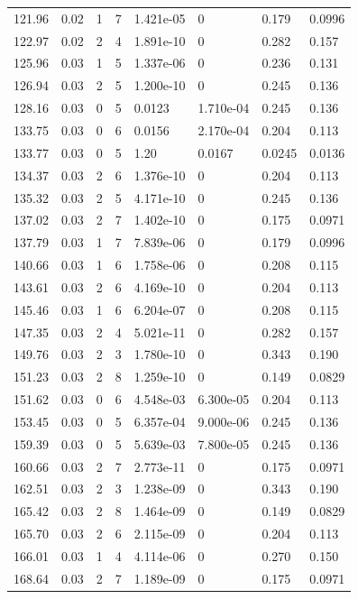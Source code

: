 \documentclass[preview]{standalone}
\begin{document}
{{{\begin{tabular}{L{1.2cm}C{1.2cm} C{0.3cm}C{0.5cm} C{1.4cm}C{1.4cm} C{1.4cm}C{1.4cm}}
  121.96  &  0.02  & 1     &  7 &  1.421e-05  & 0  & 0.179 &  0.0996   \\ 
  122.97  &  0.02  & 2     &  4 &  1.891e-10  & 0  & 0.282 &  0.157   \\ 
  125.96  &  0.03  & 1     &  5 &  1.337e-06  & 0  & 0.236 &  0.131   \\ 
  126.94  &  0.03  & 2     &  5 &  1.200e-10  & 0  & 0.245 &  0.136   \\ 
  128.16  &  0.03  & 0     &  5 &  0.0123  & 1.710e-04  & 0.245 &  0.136   \\ 
  133.75  &  0.03  & 0     &  6 &  0.0156  & 2.170e-04  & 0.204 &  0.113   \\ 
  133.77  &  0.03  & 0     &  5 &  1.20  & 0.0167  & 0.0245 &  0.0136   \\ 
  134.37  &  0.03  & 2     &  6 &  1.376e-10  & 0  & 0.204 &  0.113   \\ 
  135.32  &  0.03  & 2     &  5 &  4.171e-10  & 0  & 0.245 &  0.136   \\ 
  137.02  &  0.03  & 2     &  7 &  1.402e-10  & 0  & 0.175 &  0.0971   \\ 
  137.79  &  0.03  & 1     &  7 &  7.839e-06  & 0  & 0.179 &  0.0996   \\ 
  140.66  &  0.03  & 1     &  6 &  1.758e-06  & 0  & 0.208 &  0.115   \\ 
  143.61  &  0.03  & 2     &  6 &  4.169e-10  & 0  & 0.204 &  0.113   \\ 
  145.46  &  0.03  & 1     &  6 &  6.204e-07  & 0  & 0.208 &  0.115   \\ 
  147.35  &  0.03  & 2     &  4 &  5.021e-11  & 0  & 0.282 &  0.157   \\ 
  149.76  &  0.03  & 2     &  3 &  1.780e-10  & 0  & 0.343 &  0.190   \\ 
  151.23  &  0.03  & 2     &  8 &  1.259e-10  & 0  & 0.149 &  0.0829   \\ 
  151.62  &  0.03  & 0     &  6 &  4.548e-03  & 6.300e-05  & 0.204 &  0.113   \\ 
  153.45  &  0.03  & 0     &  5 &  6.357e-04  & 9.000e-06  & 0.245 &  0.136   \\ 
  159.39  &  0.03  & 0     &  5 &  5.639e-03  & 7.800e-05  & 0.245 &  0.136   \\ 
  160.66  &  0.03  & 2     &  7 &  2.773e-11  & 0  & 0.175 &  0.0971   \\ 
  162.51  &  0.03  & 2     &  3 &  1.238e-09  & 0  & 0.343 &  0.190   \\ 
  165.42  &  0.03  & 2     &  8 &  1.464e-09  & 0  & 0.149 &  0.0829   \\ 
  165.70  &  0.03  & 2     &  6 &  2.115e-09  & 0  & 0.204 &  0.113   \\ 
  166.01  &  0.03  & 1     &  4 &  4.114e-06  & 0  & 0.270 &  0.150   \\ 
  168.64  &  0.03  & 2     &  7 &  1.189e-09  & 0  & 0.175 &  0.0971   \\ 
\hline 
\end{tabular} 

}}}
\end{document}
